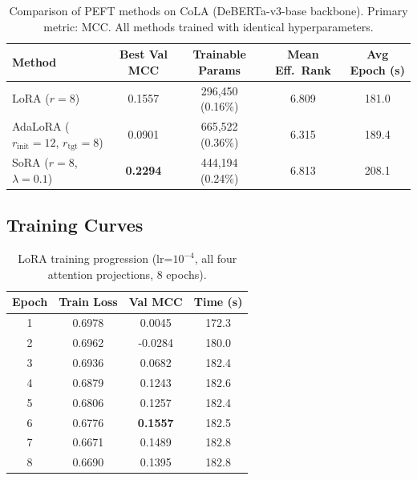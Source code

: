 \documentclass[12pt,a4paper]{article}
\theoremstyle{definition}
\begin{document}
\begin{table}[H]
\centering
\caption{Comparison of PEFT methods on CoLA (DeBERTa-v3-base backbone). Primary metric: MCC. All methods trained with identical hyperparameters.}
\label{tab:main_results}
\begin{tabular}{lcccc}
\toprule
\textbf{Method} & \textbf{Best Val MCC} & \textbf{Trainable Params} & \textbf{Mean Eff.\ Rank} & \textbf{Avg Epoch (s)} \\
\midrule
LoRA ($r=8$)           & 0.1557 & 296,450  (0.16\%) & 6.809 & 181.0 \\
AdaLoRA ($r_{\text{init}}=12$, $r_{\text{tgt}}=8$) & 0.0901 & 665,522 (0.36\%) & 6.315 & 189.4 \\
SoRA ($r=8$, $\lambda=0.1$)   & \textbf{0.2294} & 444,194  (0.24\%) & 6.813 & 208.1 \\
\bottomrule
\end{tabular}
\end{table}

\subsection{Training Curves}

\begin{table}[H]
\centering
\caption{LoRA training progression (lr=$10^{-4}$, all four attention projections, 8 epochs).}
\label{tab:lora_curve}
\begin{tabular}{cccc}
\toprule
Epoch & Train Loss & Val MCC & Time (s) \\
\midrule
1 & 0.6978 & 0.0045  & 172.3 \\
2 & 0.6962 & -0.0284 & 180.0 \\
3 & 0.6936 & 0.0682  & 182.4 \\
4 & 0.6879 & 0.1243  & 182.6 \\
5 & 0.6806 & 0.1257  & 182.4 \\
6 & 0.6776 & \textbf{0.1557}  & 182.5 \\
7 & 0.6671 & 0.1489  & 182.8 \\
8 & 0.6690 & 0.1395  & 182.8 \\
\bottomrule
\end{tabular}
\end{table}
\end{document}
